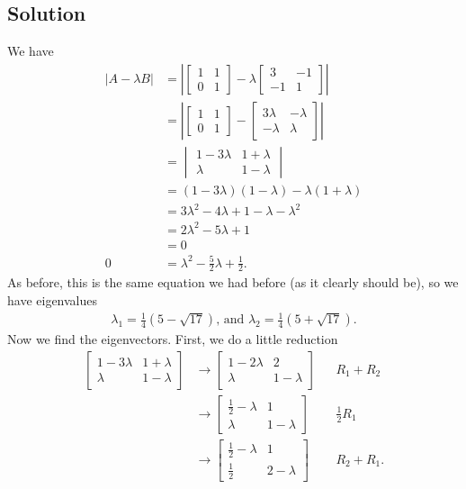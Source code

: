 \documentclass[10pt,a4paper]{article}
\theoremstyle{definition}
\begin{document}
\subsection*{Solution}
We have
\begin{align*}
|A - \lambda B| &= \left| \begin{bmatrix}
1 & 1\\
0 & 1
\end{bmatrix} - \lambda \begin{bmatrix}
3 & -1\\
-1 & 1
\end{bmatrix} \right|\\
&= \left| \begin{bmatrix}
1 & 1\\
0 & 1
\end{bmatrix} - \begin{bmatrix}
3 \lambda & -\lambda\\
-\lambda & \lambda
\end{bmatrix} \right|\\
&= \begin{vmatrix}
1 - 3 \lambda & 1 + \lambda\\
\lambda & 1 - \lambda
\end{vmatrix}\\
&= (1 - 3\lambda)(1-\lambda) -\lambda (1+\lambda)\\
&= 3\lambda^2 - 4\lambda + 1 -\lambda - \lambda^2\\
&= 2\lambda^2 - 5\lambda + 1\\
&= 0\\
0 &= \lambda^2 - \frac{5}{2} \lambda + \frac{1}{2}.
\end{align*}
As before, this is the same equation we had before (as it clearly should be), so we have eigenvalues 
\begin{align*}
\lambda_1 = \frac{1}{4}(5 - \sqrt{17}) \text{, and } \lambda_2 = \frac{1}{4}(5 + \sqrt{17}).
\end{align*}
Now we find the eigenvectors. First, we do a little reduction
\begin{align*}
\begin{bmatrix}
1 - 3 \lambda & 1 + \lambda\\
\lambda & 1 - \lambda
\end{bmatrix} &\to \begin{bmatrix}
1 - 2 \lambda & 2\\
\lambda & 1 - \lambda
\end{bmatrix} && R_1 + R_2\\
&\to \begin{bmatrix}
\frac{1}{2} - \lambda & 1\\
\lambda & 1 - \lambda
\end{bmatrix} && \frac{1}{2}R_1\\
&\to \begin{bmatrix}
\frac{1}{2} - \lambda & 1\\
\frac{1}{2} & 2 - \lambda
\end{bmatrix} && R_2 + R_1.
\end{align*}
\end{document}
